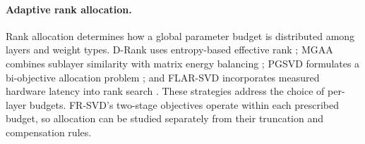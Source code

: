 \paragraph{Adaptive rank allocation.}
Rank allocation determines how a global parameter budget is distributed among layers and weight types. D-Rank uses entropy-based effective rank \citep{mi2025drank}; MGAA combines sublayer similarity with matrix energy balancing \citep{li2025mgaa}; PGSVD formulates a bi-objective allocation problem \citep{solgi2025pgsvd}; and FLAR-SVD incorporates measured hardware latency into rank search \citep{thoma2025flarsvd}. These strategies address the choice of per-layer budgets. FR-SVD's two-stage objectives operate within each prescribed budget, so allocation can be studied separately from their truncation and compensation rules.
